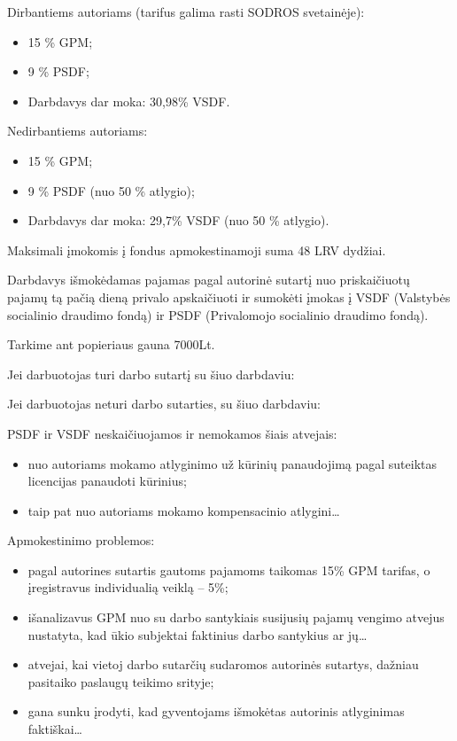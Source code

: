 Dirbantiems autoriams (tarifus galima rasti SODROS svetainėje):
\begin{itemize}
  \item 15 \% GPM;
  \item 9 \% PSDF;
  \item Darbdavys dar moka: 30,98\% VSDF.
\end{itemize}

Nedirbantiems autoriams:
\begin{itemize}
  \item 15 \% GPM;
  \item 9 \% PSDF (nuo 50 \% atlygio);
  \item Darbdavys dar moka: 29,7\% VSDF (nuo 50 \% atlygio).
\end{itemize}

Maksimali įmokomis į fondus apmokestinamoji suma 48 LRV dydžiai.

Darbdavys išmokėdamas pajamas pagal autorinė sutartį nuo priskaičiuotų
pajamų tą pačią dieną privalo apskaičiuoti ir sumokėti įmokas į
VSDF (Valstybės socialinio draudimo fondą) ir PSDF (Privalomojo
socialinio draudimo fondą).

\begin{exmp}
  Tarkime ant popieriaus gauna 7000Lt.

  Jei darbuotojas turi darbo sutartį su šiuo darbdaviu:


  Jei darbuotojas neturi darbo sutarties, su šiuo darbdaviu:


\end{exmp}

PSDF ir VSDF  neskaičiuojamos ir nemokamos šiais atvejais:
\begin{itemize}
  \item nuo autoriams mokamo atlyginimo už kūrinių panaudojimą
    pagal suteiktas licencijas panaudoti kūrinius;
  \item taip pat nuo autoriams mokamo kompensacinio atlygini…
\end{itemize}

Apmokestinimo problemos:
\begin{itemize}
  \item pagal autorines sutartis gautoms pajamoms taikomas 15\% GPM
    tarifas, o įregistravus individualią veiklą – 5\%;
  \item išanalizavus GPM nuo su darbo santykiais susijusių pajamų vengimo
    atvejus nustatyta, kad ūkio subjektai faktinius darbo santykius
    ar jų…
  \item atvejai, kai vietoj darbo sutarčių sudaromos autorinės sutartys,
    dažniau pasitaiko paslaugų teikimo srityje;
  \item gana sunku įrodyti, kad gyventojams išmokėtas autorinis atlyginimas
    faktiškai…
\end{itemize}

